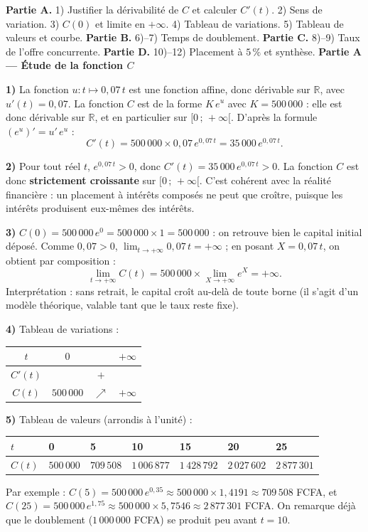 \documentclass[11pt]{article}
\begin{document}
\begin{exoresolu}
\textbf{Partie A.} 1) Justifier la dérivabilité de $C$ et calculer $C'(t)$. 2) Sens de variation. 3) $C(0)$ et limite en $+\infty$. 4) Tableau de variations. 5) Tableau de valeurs et courbe. \textbf{Partie B.} 6)--7) Temps de doublement. \textbf{Partie C.} 8)--9) Taux de l'offre concurrente. \textbf{Partie D.} 10)--12) Placement à $5\,\%$ et synthèse.
\tcblower
\textbf{Partie A — Étude de la fonction $C$}

\textbf{1)} La fonction $u : t \mapsto 0,07\,t$ est une fonction affine, donc dérivable sur $\mathbb{R}$, avec $u'(t) = 0,07$. La fonction $C$ est de la forme $K\,e^{u}$ avec $K = 500\,000$ : elle est donc dérivable sur $\mathbb{R}$, et en particulier sur $[0\,;\,+\infty[$. D'après la formule $\left(e^{u}\right)' = u'\,e^{u}$ :
\[ C'(t) = 500\,000 \times 0,07\,e^{0,07\,t} = 35\,000\,e^{0,07\,t}. \]

\textbf{2)} Pour tout réel $t$, $e^{0,07\,t} > 0$, donc $C'(t) = 35\,000\,e^{0,07\,t} > 0$. La fonction $C$ est donc \textbf{strictement croissante} sur $[0\,;\,+\infty[$. C'est cohérent avec la réalité financière : un placement à intérêts composés ne peut que croître, puisque les intérêts produisent eux-mêmes des intérêts.

\textbf{3)} $C(0) = 500\,000\,e^{0} = 500\,000 \times 1 = 500\,000$ : on retrouve bien le capital initial déposé. Comme $0,07 > 0$, $\displaystyle\lim_{t \to +\infty} 0,07\,t = +\infty$ ; en posant $X = 0,07\,t$, on obtient par composition :
\[ \lim_{t \to +\infty} C(t) = 500\,000 \times \lim_{X \to +\infty} e^{X} = +\infty. \]
Interprétation : sans retrait, le capital croît au-delà de toute borne (il s'agit d'un modèle théorique, valable tant que le taux reste fixe).

\textbf{4)} Tableau de variations :
\begin{center}
\begin{tabular}{|c|ccc|}
\hline
\rowcolor{popblueL} $t$ & $0$ & & $+\infty$ \\
\hline
$C'(t)$ & & $+$ & \\
\hline
$C(t)$ & $500\,000$ & $\nearrow$ & $+\infty$ \\
\hline
\end{tabular}
\end{center}

\textbf{5)} Tableau de valeurs (arrondis à l'unité) :
\begin{center}
\begin{tabularx}{\linewidth}{|l|X|X|X|X|X|X|}
\hline
\rowcolor{popblueL} $t$ & 0 & 5 & 10 & 15 & 20 & 25 \\
\hline
$C(t)$ & $500\,000$ & $709\,508$ & $1\,006\,877$ & $1\,428\,792$ & $2\,027\,602$ & $2\,877\,301$ \\
\hline
\end{tabularx}
\end{center}
Par exemple : $C(5) = 500\,000\,e^{0,35} \approx 500\,000 \times 1,4191 \approx 709\,508$ FCFA, et $C(25) = 500\,000\,e^{1,75} \approx 500\,000 \times 5,7546 \approx 2\,877\,301$ FCFA. On remarque déjà que le doublement ($1\,000\,000$ FCFA) se produit peu avant $t = 10$.


\end{exoresolu}
\end{document}
